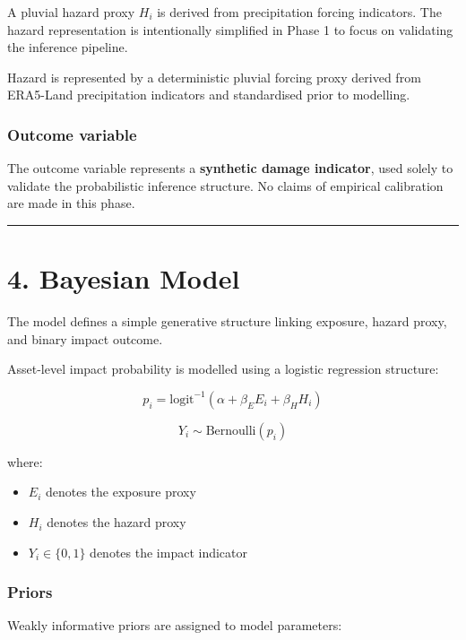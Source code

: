 \documentclass[
]{article}
\providecommand{\tightlist}{%
  \setlength{\itemsep}{0pt}\setlength{\parskip}{0pt}}
\begin{document}
A pluvial hazard proxy \(H_i\) is derived from precipitation forcing
indicators. The hazard representation is intentionally simplified in
Phase 1 to focus on validating the inference pipeline.

Hazard is represented by a deterministic pluvial forcing proxy derived
from ERA5-Land precipitation indicators and standardised prior to
modelling.

\subsubsection{Outcome variable}\label{outcome-variable}

The outcome variable represents a \textbf{synthetic damage indicator},
used solely to validate the probabilistic inference structure. No claims
of empirical calibration are made in this phase.

\begin{center}\rule{0.5\linewidth}{0.5pt}\end{center}

\section{4. Bayesian Model}\label{bayesian-model}

The model defines a simple generative structure linking exposure, hazard
proxy, and binary impact outcome.

Asset-level impact probability is modelled using a logistic regression
structure:

\[
p_i =
\text{logit}^{-1}
\left(
\alpha + \beta_E E_i + \beta_H H_i
\right)
\]

\[
Y_i \sim \text{Bernoulli}(p_i)
\]

where:

\begin{itemize}
\tightlist
\item
  \(E_i\) denotes the exposure proxy
\item
  \(H_i\) denotes the hazard proxy
\item
  \(Y_i \in \{0,1\}\) denotes the impact indicator
\end{itemize}

\subsubsection{Priors}\label{priors}

Weakly informative priors are assigned to model parameters:
\end{document}
